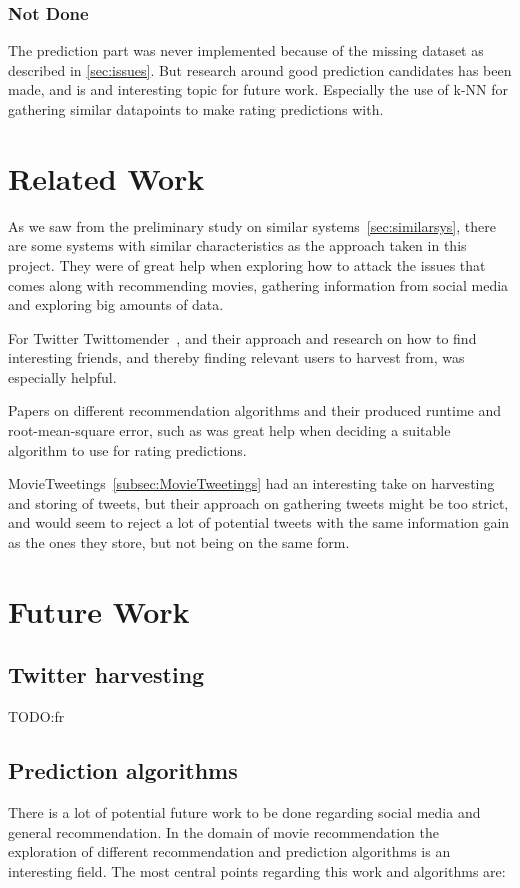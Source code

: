 \subsubsection{Not Done}
The prediction part was never implemented because of the missing dataset as described in \ref{sec:issues}. But research around good prediction candidates has been made, and is and interesting topic for future work. Especially the use of k-NN for gathering similar datapoints to make rating predictions with.





\section{Related Work}
As we saw from the preliminary study on similar systems~\ref{sec:similarsys}, there are some systems with similar characteristics as the approach taken in this project. They were of great help when exploring how to attack the issues that comes along with recommending movies, gathering information from social media and exploring big amounts of data.

For Twitter Twittomender~\cite{twittomender}, and their approach and research on how to find interesting friends, and thereby finding relevant users to harvest from, was especially helpful.

Papers on different recommendation algorithms and their produced runtime and root-mean-square error, such as \cite{bigchaos-sol,alsMPI,BellKor-CF-TD} was great help when deciding a suitable algorithm to use for rating predictions.

MovieTweetings~\ref{subsec:MovieTweetings} had an interesting take on harvesting and storing of tweets, but their approach on gathering tweets might be too strict, and would seem to reject a lot of potential tweets with the same information gain as the ones they store, but not being on the same form.




\section{Future Work}
\subsection{Twitter harvesting}
TODO:fr



\subsection{Prediction algorithms}
There is a lot of potential future work to be done regarding social media and general recommendation. In the domain of movie recommendation the exploration of different recommendation and prediction algorithms is an interesting field. The most central points regarding this work and algorithms are:

